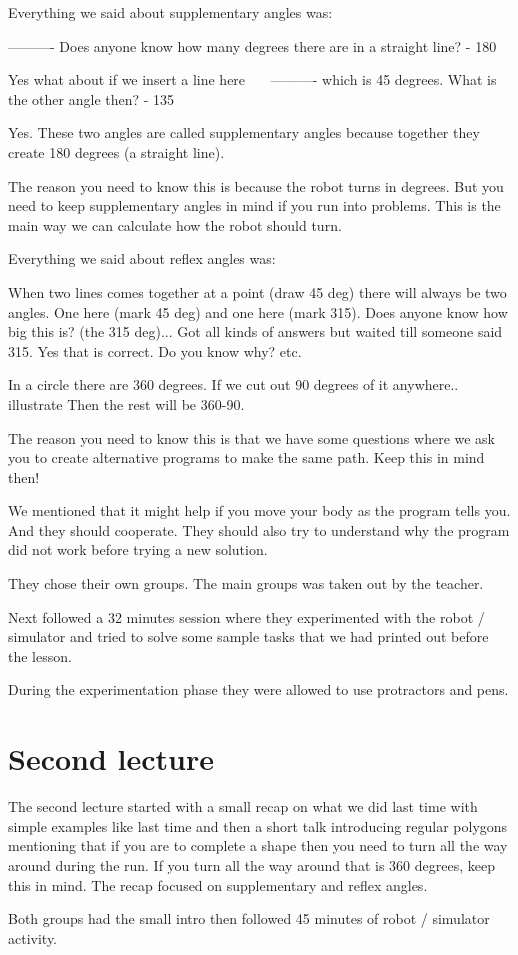 Everything we said about supplementary angles was:

---------- 
Does anyone know how many degrees there are in a straight line?
 - 180

Yes what about if we insert a line here
\
   \
     \
----------
which is 45 degrees. What is the other angle then?
 - 135 
 
Yes. These two angles are called supplementary angles because together they create 180 degrees (a straight line). 

The reason you need to know this is because the robot turns in degrees. But you need to keep supplementary angles in mind if you run into problems. This is the main way we can calculate how the robot should turn. 

Everything we said about reflex angles was:

When two lines comes together at a point (draw 45 deg) there will always be two angles. One here (mark 45 deg) and one here (mark 315). Does anyone know how big this is? (the 315 deg)... Got all kinds of answers but waited till someone said 315. Yes that is correct. Do you know why? etc.

In a circle there are 360 degrees. If we cut out 90 degrees of it anywhere.. illustrate
Then the rest will be 360-90. 

The reason you need to know this is that we have some questions where we ask you to create alternative programs to make the same path. Keep this in mind then! 



We mentioned that it might help if you move your body as the program tells you. And they should cooperate. They should also try to understand why the program did not work before trying a new solution. 



They chose their own groups. The main groups was taken out by the teacher. 


Next followed a 32 minutes session where they experimented with the robot / simulator and tried to solve some sample tasks that we had printed out before the lesson. 

During the experimentation phase they were allowed to use protractors and pens. 

\section{Second lecture}
The second lecture started with a small recap on what we did last time with simple examples like last time and then a short talk introducing regular polygons mentioning that if you are to complete a shape then you need to turn all the way around during the run. If you turn all the way around that is 360 degrees, keep this in mind. The recap focused on supplementary and reflex angles.

Both groups had the small intro then followed 45 minutes of robot / simulator activity. 